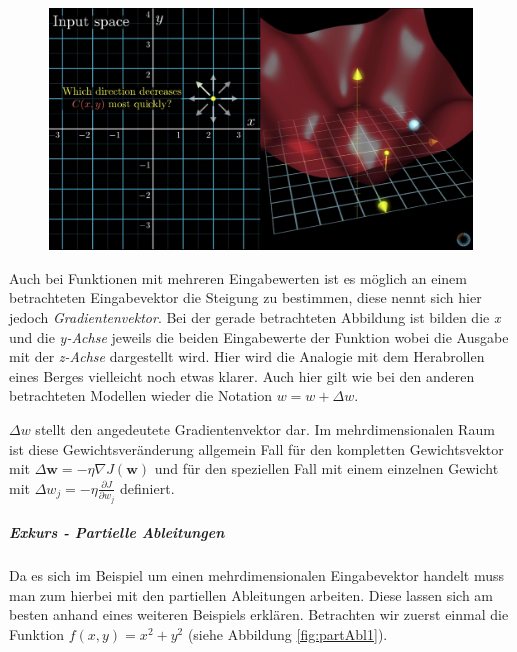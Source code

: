 \begin{figure}[!htb]
	\centering
	\includegraphics[width=\linewidth]{img/3dPlot_1}
	\label{fig:ad_gd3}
\end{figure}

Auch bei Funktionen mit mehreren Eingabewerten ist es möglich an einem betrachteten Eingabevektor die Steigung zu bestimmen, diese nennt sich hier jedoch \emph{Gradientenvektor}. Bei der gerade betrachteten Abbildung ist bilden die \emph{x} und die \emph{y-Achse} jeweils die beiden Eingabewerte der Funktion wobei die Ausgabe mit der \emph{z-Achse} dargestellt wird. Hier wird die Analogie mit dem Herabrollen eines Berges vielleicht noch etwas klarer. Auch hier gilt wie bei den anderen betrachteten Modellen wieder die Notation $w = w + \Delta w$. 

$\Delta w$ stellt den angedeutete Gradientenvektor dar. Im mehrdimensionalen Raum ist diese Gewichtsveränderung allgemein Fall für den kompletten Gewichtsvektor mit $\Delta \mathbf{w} = - \eta \nabla J(\mathbf{w})$ und für den speziellen Fall mit einem einzelnen Gewicht mit $\Delta w_j = - \eta \frac{\partial J}{\partial w_j}$ definiert. 

\subparagraph{Exkurs - Partielle Ableitungen} \cite{partAbl}
Da es sich im Beispiel um einen mehrdimensionalen Eingabevektor handelt muss man zum hierbei mit den partiellen Ableitungen arbeiten. Diese lassen sich am besten anhand eines weiteren Beispiels erklären. Betrachten wir zuerst einmal die Funktion $f(x, y) = x^2 + y^2$ (siehe Abbildung \ref{fig:partAbl1}). 

